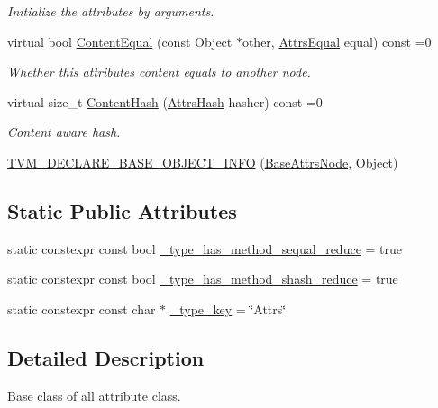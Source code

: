 \begin{DoxyCompactItemize}
\begin{DoxyCompactList}\small\item\em Initialize the attributes by arguments. \end{DoxyCompactList}\item 
virtual bool \hyperlink{classtvm_1_1BaseAttrsNode_a39c5a3e9c732b7d1132192af4c6297cc}{Content\+Equal} (const Object $\ast$other, \hyperlink{classtvm_1_1AttrsEqual}{Attrs\+Equal} equal) const =0
\begin{DoxyCompactList}\small\item\em Whether this attribute\textquotesingle{}s content equals to another node. \end{DoxyCompactList}\item 
virtual size\+\_\+t \hyperlink{classtvm_1_1BaseAttrsNode_a3a25e3f163d3a4a1d50d33a160697d0c}{Content\+Hash} (\hyperlink{classtvm_1_1AttrsHash}{Attrs\+Hash} hasher) const =0
\begin{DoxyCompactList}\small\item\em Content aware hash. \end{DoxyCompactList}\item 
\hyperlink{classtvm_1_1BaseAttrsNode_aaca524319f015a18a1385cfea5ba8895}{T\+V\+M\+\_\+\+D\+E\+C\+L\+A\+R\+E\+\_\+\+B\+A\+S\+E\+\_\+\+O\+B\+J\+E\+C\+T\+\_\+\+I\+N\+FO} (\hyperlink{classtvm_1_1BaseAttrsNode}{Base\+Attrs\+Node}, Object)
\end{DoxyCompactItemize}
\subsection*{Static Public Attributes}
\begin{DoxyCompactItemize}
\item 
static constexpr const bool \hyperlink{classtvm_1_1BaseAttrsNode_ad812afdb028fe3944a80cd922dceff82}{\+\_\+type\+\_\+has\+\_\+method\+\_\+sequal\+\_\+reduce} = true
\item 
static constexpr const bool \hyperlink{classtvm_1_1BaseAttrsNode_ad85f4aca5e8840d23851c0c07acd0862}{\+\_\+type\+\_\+has\+\_\+method\+\_\+shash\+\_\+reduce} = true
\item 
static constexpr const char $\ast$ \hyperlink{classtvm_1_1BaseAttrsNode_a8e4fd4e728774e0556cda84b0c2b80d6}{\+\_\+type\+\_\+key} = \char`\"{}Attrs\char`\"{}
\end{DoxyCompactItemize}


\subsection{Detailed Description}
Base class of all attribute class. 

